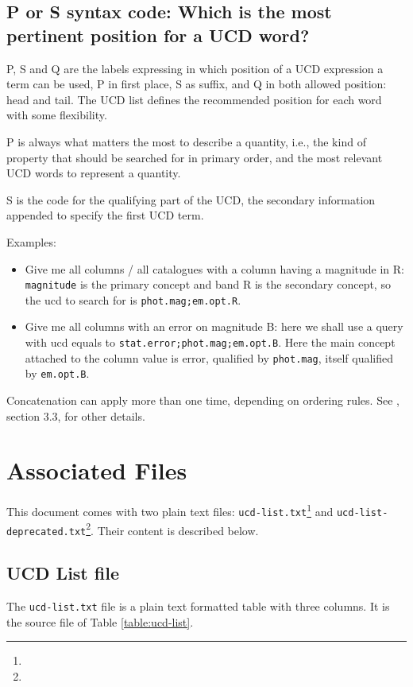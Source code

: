 \documentclass[11pt,a4paper]{ivoa}
\begin{document}
\subsection{P or S syntax code: Which is the most pertinent position for a UCD word?}
P, S and Q are the labels expressing in which position of a UCD expression a term can be used, P 
in first place, S as suffix, and Q in both allowed position: head and tail. The UCD list defines 
the recommended position for each word with some flexibility.

P is always what matters the most to describe a quantity, i.e., the kind of property that should be 
searched for in primary order, and the most relevant UCD words to represent a quantity.

S is the code for the qualifying part of the UCD, the secondary information appended to specify 
the first UCD term.

Examples:
\begin{itemize}
\item Give me all columns / all catalogues with a column having a magnitude in R: {\tt magnitude} 
is the primary concept and band R is the secondary concept, so the ucd to search for is 
{\tt phot.mag;em.opt.R}.
\item Give me all columns with an error on magnitude B: here we shall use a query with ucd 
equals to {\tt stat.error;phot.mag;em.opt.B}. Here the main concept attached to the column 
value is error, qualified by {\tt phot.mag}, itself qualified by {\tt em.opt.B}.
\end{itemize}
Concatenation can apply more than one time, depending on ordering rules. See \citet{2005ivoa.spec.0819D}, section 3.3, 
for other details.

\section{Associated Files}
This document comes with two plain text files:
\texttt{ucd-list.txt}\footnote{} and 
\texttt{ucd-list-deprecated.txt}\footnote{}. 
Their content is described below. 

\subsection{UCD List file}
The \texttt{ucd-list.txt} file is a plain text formatted table with
three columns.
It is the source file of Table \ref{table:ucd-list}.
\end{document}
